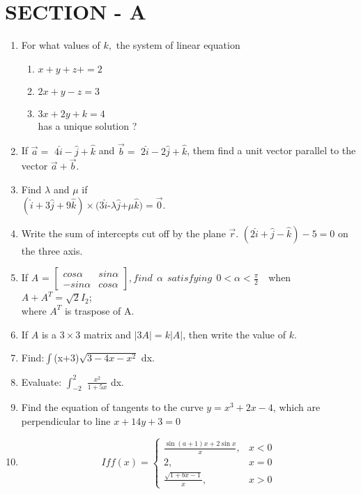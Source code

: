 \documentclass[12pt,-letter paper]{article}
\providecommand{\myvec}[1]{\ensuremath{\begin{bmatrix}#1\end{bmatrix}}}
\begin{document}
\section*{SECTION - A}
\begin{enumerate}
	\item    For what values of $ k, $ the system of linear equation
      \begin{enumerate}
      \item $ x+y+z+=2 $
      \item $ 2x+y-z=3 $
      \item $ 3x+2y+k=4 $ \\
       has a unique solution ?      
      \end{enumerate}
\item If $\overrightarrow{a}=$ $4\hat{i}-\hat{j}+\hat{k}$ and $\overrightarrow{b}=$ $2\hat{i}-2\hat{j}+\hat{k}$, them find a unit vector parallel to the vector $\overrightarrow{a}+\overrightarrow{b}.$
\item Find $\lambda$ and $\mu$ if \\
$(\hat{i}+3\hat{j}+9\hat{k})\times(3\hat{i}$-$\lambda$$\hat{j}$+$\mu$$\hat{k})=\overrightarrow{0}$.
\item Write the sum of intercepts cut off by the plane $\overrightarrow{r}$. $(2\hat{i}+\hat{j}-\hat{k})-5=0$ on the three axis.
\item If $A$ = $\myvec{cos \alpha & sin \alpha \\ -sin \alpha & cos \alpha}, find\ \ \alpha\ \ satisfying\ \ 0< \alpha < \frac{\pi}{2}$\ \
 when\  \ $A+A^{T}=\sqrt{2}I_{2}$; \\ where $A^{T}$ is traspose of A.
\item If $A$ is a $3\times3$ matrix and $|3A|=k|A|$, then write the value of $k.$ 	
\item Find:$\int$(x+3)$\sqrt{3-4x-x^2}$ dx.	
\item Evaluate: $\int_{-2}^{2}$ $\frac{x^2}{1+5x}$ dx.
\item Find the equation of tangents to the curve $y=x^3+2x-4$, which are perpendicular to line $x+14y+3=0 $
\item \[ If f(x)=
	\begin{cases}
		\frac{\sin(a+1)x + 2\sin x}{x},& x<0 \\
		        2, &x = 0 \\
		\frac{\sqrt{1+bx-1}}{x}, & x>0
	\end{cases}
        \]


\end{enumerate}
\end{document}
